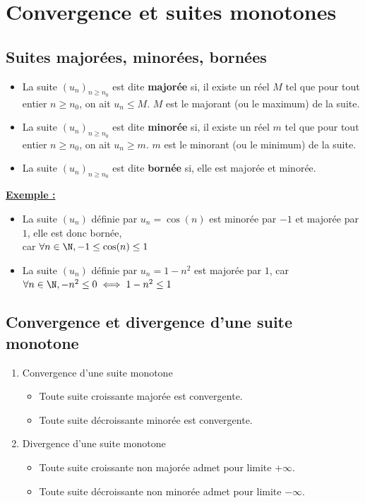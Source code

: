 \documentclass[11pt,twoside, openany]{extbook}
\begin{document}
\section{Convergence et suites monotones}
\subsection{Suites majorées, minorées, bornées}
\begin{defi}
    \begin{itemize}
\item La suite $(u_n)_{n \geqslant n_0}$ est dite \textbf{majorée} si, il existe un réel $M$ tel que pour tout entier $n\geqslant n_0$, on ait $u_n \leqslant M$. $M$ est le majorant (ou le maximum) de la suite.
\item La suite $(u_n)_{n \geqslant n_0}$ est dite \textbf{minorée} si, il existe un réel $m$ tel que pour tout entier $n\geqslant n_0$, on ait $u_n \geqslant m$. $m$ est le minorant (ou le minimum) de la suite.
\item La suite $(u_n)_{n \geqslant n_0}$ est dite \textbf{bornée} si, elle est majorée et minorée.
\end{itemize}
\end{defi}

\medskip
\noindent \textbf{\ul{Exemple :}}
\begin{itemize}
\item La suite $(u_n)$ définie par $u_n=\cos(n)$ est minorée par $-1$ et majorée par $1$, elle est donc bornée, \\ car $\forall n \in \N, -1 \leq \cos(n) \leq 1$
\item La suite $(u_n)$ définie par $u_n=1- n^2$ est majorée par $1$, car $\forall n \in \N, - n^2 \leq 0 \iff 1 - n^2 \leq 1 $ 
\end{itemize}



\subsection{Convergence et divergence d'une suite monotone} 
\begin{prop}
\begin{enumerate}
\item Convergence d'une suite monotone
\begin{itemize}
    \item Toute suite croissante majorée est convergente.
    \item Toute suite décroissante minorée est convergente.
\end{itemize}
\item Divergence d'une suite monotone
\begin{itemize}
    \item Toute suite croissante non majorée admet pour limite $+\infty$.
    \item Toute suite décroissante non minorée admet pour limite $-\infty$.
\end{itemize}
\end{enumerate}
\end{prop}
\end{document}
